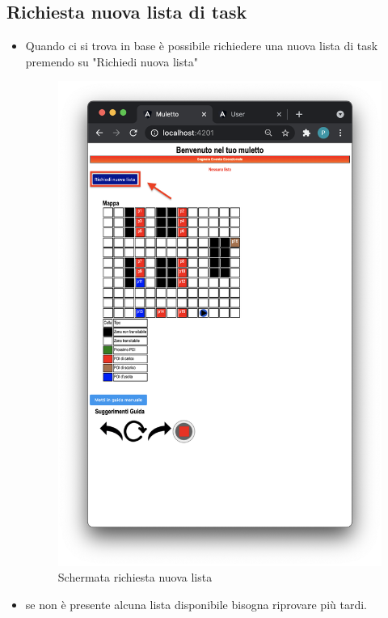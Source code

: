 \subsection{Richiesta nuova lista di task}
\begin{itemize}
    \item Quando ci si trova in base è possibile richiedere una nuova lista di task premendo su "Richiedi nuova lista"
    \begin{figure}[H]
        \centering
        \includegraphics[scale=0.45]{res/images/nuovalista.png}
        \caption{Schermata richiesta nuova lista}
    \end{figure}
    \item se non è presente alcuna lista disponibile bisogna riprovare più tardi.
    \begin{figure}[H]

\end{figure}
\end{itemize}
